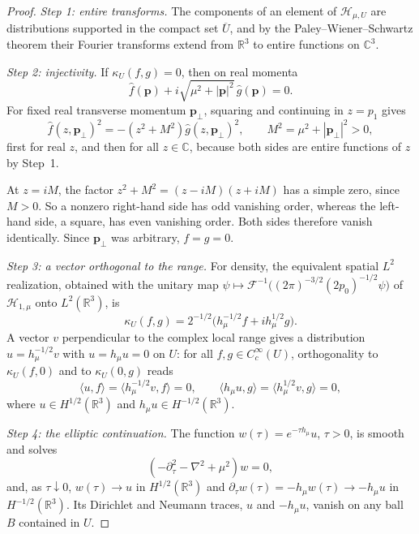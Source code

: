 \documentclass[11pt]{amsart}
\numberwithin{equation}{section}
\theoremstyle{definition}
\newcommand{\R}{\mathbb R}
\newcommand{\C}{\mathbb C}
\newcommand{\Hh}{\mathcal H}
\newcommand{\bp}{\mathbf p}
\newcommand{\ip}[2]{\langle #1,#2\rangle}
\newcommand{\wh}[1]{\widehat{#1}}
\begin{document}
\begin{proof}
\emph{Step 1: entire transforms.} The components
of an element of \(\Hh_{\mu,U}\) are distributions supported in the
compact set \(\overline U\), and by the Paley--Wiener--Schwartz theorem
their Fourier transforms extend from \(\R^3\) to entire functions on
\(\C^3\).

\smallskip
\emph{Step 2: injectivity.} If \(\kappa_U(f,g)=0\), then on real momenta
\[
 \wh f(\bp)+i\sqrt{\mu^2+|\bp|^2}\,\wh g(\bp)=0.
\]
For fixed real transverse momentum \(\bp_\perp\), squaring and
continuing in \(z=p_1\) gives
\[
 \wh f(z,\bp_\perp)^2
 =-(z^2+M^2)\wh g(z,\bp_\perp)^2,\qquad
 M^2=\mu^2+|\bp_\perp|^2>0,
\]
first for real \(z\), and then for all \(z\in\C\), because both sides
are entire functions of \(z\) by Step~1.

At \(z=iM\), the factor
\(z^2+M^2=(z-iM)(z+iM)\) has a simple zero, since \(M>0\). So a nonzero
right-hand side has odd vanishing order, whereas the left-hand side, a
square, has even vanishing order. Both sides therefore
vanish identically. Since \(\bp_\perp\) was arbitrary, \(f=g=0\).

\smallskip
\emph{Step 3: a vector orthogonal to the range.} For density, the
equivalent spatial \(L^2\) realization, obtained with the unitary map
\(\psi\mapsto\mathcal F^{-1}\bigl((2\pi)^{-3/2}(2p_0)^{-1/2}\psi\bigr)\)
of \(\Hh_{1,\mu}\) onto \(L^2(\R^3)\), is
\[
 \kappa_U(f,g)=2^{-1/2}
 \bigl(h_\mu^{-1/2}f+ih_\mu^{1/2}g\bigr).
\]
A vector \(v\) perpendicular to the complex local range gives a
distribution \(u=h_\mu^{-1/2}v\) with \(u=h_\mu u=0\) on \(U\): for all
\(f,g\in C_c^\infty(U)\), orthogonality to \(\kappa_U(f,0)\) and to
\(\kappa_U(0,g)\) reads
\[
 \ip{u}{f}=\ip{h_\mu^{-1/2}v}{f}=0,\qquad
 \ip{h_\mu u}{g}=\ip{h_\mu^{1/2}v}{g}=0,
\]
where \(u\in H^{1/2}(\R^3)\) and \(h_\mu u\in H^{-1/2}(\R^3)\).

\smallskip
\emph{Step 4: the elliptic continuation.} The function
\(w(\tau)=e^{-\tau h_\mu}u\), \(\tau>0\), is smooth and solves
\[
 (-\partial_\tau^2-\nabla^2+\mu^2)w=0,
\]
and, as \(\tau\downarrow0\), \(w(\tau)\to u\) in \(H^{1/2}(\R^3)\) and
\(\partial_\tau w(\tau)=-h_\mu w(\tau)\to-h_\mu u\) in
\(H^{-1/2}(\R^3)\). Its Dirichlet and Neumann traces, \(u\) and
\(-h_\mu u\), vanish on any ball \(B\) contained in \(U\).


\end{proof}
\end{document}
